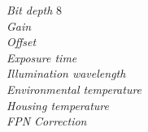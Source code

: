 
\colorbox{greylight}{
\begin{minipage}[t]{0.975\linewidth}
\begin{multicols}{2}
\textsl{Bit depth} \hfill 8
\\[1mm]
\textsl{Gain} \hfill %
\\[1mm]
\textsl{Offset} \hfill %
\\[1mm]
\textsl{Exposure time} \hfill %
\\[1mm]
\textsl{Illumination wavelength} \hfill %
\\[1mm]
\textsl{Environmental temperature} \hfill %
\\[1mm]
\textsl{Housing temperature} \hfill %
\\[1mm]
\textsl{FPN Correction} \hfill %
\\[1mm]
\end{multicols}
\end{minipage}
}
